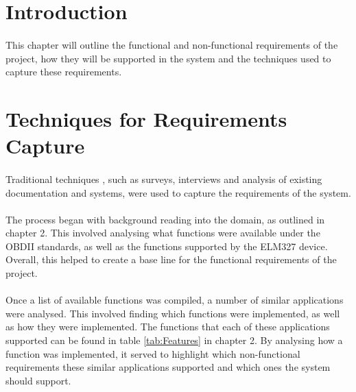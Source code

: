 \section{Introduction}
	\paragraph{}{
	This chapter will outline the functional and non-functional requirements of the project, how they will be supported in the system and the techniques used to capture these requirements.
	}		

\section{Techniques for Requirements Capture}	
	\paragraph{}{
	Traditional techniques \cite{ReqEng}, such as surveys, interviews and analysis of existing documentation and systems, were used to capture the requirements of the system.
	}
	\paragraph{}{
	The process began with background reading into the domain, as outlined in chapter 2. This involved analysing what functions were available under the OBDII standards, as well as the functions supported by the ELM327 device. Overall, this helped to create a base line for the functional requirements of the project.
	}	
	\paragraph{}{
	Once a list of available functions was compiled, a number of similar applications were analysed. This involved finding which functions were implemented, as well as how they were implemented. The functions that each of these applications supported can be found in table \ref{tab:Features} in chapter 2. By analysing how a function was implemented, it served to highlight which non-functional requirements these similar applications supported and which ones the system should support.
	}
